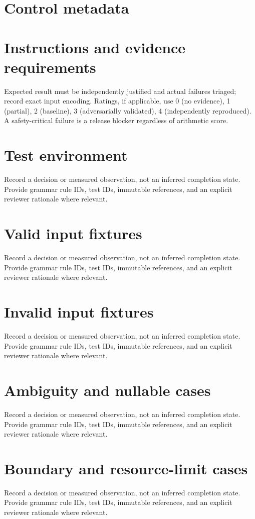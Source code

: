 \documentclass[11pt,letterpaper]{article}
\begin{document}
\makedoctitle\makedocsummary
\tableofcontents\clearpage
\section{Control metadata}
\section{Instructions and evidence requirements}
Expected result must be independently justified and actual failures triaged; record exact input encoding. Ratings, if applicable, use 0 (no evidence), 1 (partial), 2 (baseline), 3 (adversarially validated), 4 (independently reproduced). A safety-critical failure is a release blocker regardless of arithmetic score.
\section{Test environment}
Record a decision or measured observation, not an inferred completion state. Provide grammar rule IDs, test IDs, immutable references, and an explicit reviewer rationale where relevant.
\section{Valid input fixtures}
Record a decision or measured observation, not an inferred completion state. Provide grammar rule IDs, test IDs, immutable references, and an explicit reviewer rationale where relevant.
\section{Invalid input fixtures}
Record a decision or measured observation, not an inferred completion state. Provide grammar rule IDs, test IDs, immutable references, and an explicit reviewer rationale where relevant.
\section{Ambiguity and nullable cases}
Record a decision or measured observation, not an inferred completion state. Provide grammar rule IDs, test IDs, immutable references, and an explicit reviewer rationale where relevant.
\section{Boundary and resource-limit cases}
Record a decision or measured observation, not an inferred completion state. Provide grammar rule IDs, test IDs, immutable references, and an explicit reviewer rationale where relevant.
\end{document}
